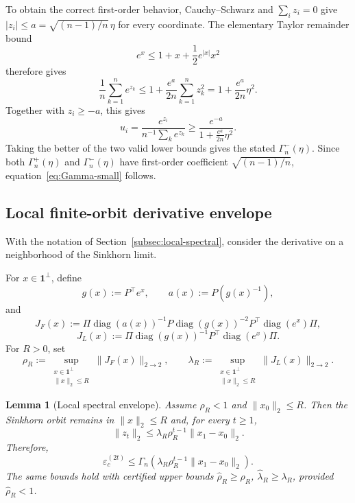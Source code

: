 \documentclass[10pt]{article}
\numberwithin{equation}{section}
\theoremstyle{plain}
\newtheorem{lemma}[theorem]{Lemma}
\theoremstyle{definition}
\theoremstyle{remark}
\newcommand{\ones}{\mathbf{1}}
\newcommand{\diag}{\operatorname{diag}}
\begin{document}
To obtain the correct first-order behavior, Cauchy--Schwarz and
\(\sum_i z_i=0\) give
\(|z_i|\le a=\sqrt{(n-1)/n}\,\eta\) for every coordinate. The elementary
Taylor remainder bound
\[
        e^x\le 1+x+\frac12 e^{|x|}x^2
\]
therefore gives
\[
        \frac1n\sum_{k=1}^n e^{z_k}
        \le
        1+\frac{e^a}{2n}\sum_{k=1}^n z_k^2
        =
        1+\frac{e^a}{2n}\eta^2.
\]
Together with \(z_i\ge-a\), this gives
\[
        u_i
        =
        \frac{e^{z_i}}{n^{-1}\sum_k e^{z_k}}
        \ge
        \frac{e^{-a}}{1+\frac{e^a}{2n}\eta^2}.
\]
Taking the better of the two valid lower bounds gives the stated
\(\Gamma_n^-(\eta)\). Since both \(\Gamma_n^+(\eta)\) and
\(\Gamma_n^-(\eta)\) have first-order coefficient
\(\sqrt{(n-1)/n}\), equation~\eqref{eq:Gamma-small} follows.

\subsection{Local finite-orbit derivative envelope}\label{app:local-envelope}

With the notation of Section~\ref{subsec:local-spectral}, consider the derivative on a neighborhood
of the Sinkhorn limit.

For \(x\in\ones^\perp\), define
\[
        g(x):=P^\top e^x,\qquad a(x):=P(g(x)^{-1}),
\]
and
\begin{equation}\label{eq:JF-JL}
        J_F(x):=
        \Pi\diag(a(x))^{-1}P\diag(g(x))^{-2}P^\top\diag(e^x)\Pi,
\end{equation}
\begin{equation}\label{eq:JL}
        J_L(x):=
        \Pi\diag(g(x))^{-1}P^\top\diag(e^x)\Pi .
\end{equation}
For \(R>0\), set
\begin{equation}\label{eq:rhoR-lambdaR}
        \rho_R:=\sup_{\substack{x\in\ones^\perp\\ \|x\|_2\le R}}\|J_F(x)\|_{2\to2},
        \qquad
        \lambda_R:=\sup_{\substack{x\in\ones^\perp\\ \|x\|_2\le R}}\|J_L(x)\|_{2\to2}.
\end{equation}

\begin{lemma}[Local spectral envelope]\label{lem:local-envelope}
Assume \(\rho_R<1\) and \(\|x_0\|_2\le R\). Then the Sinkhorn orbit remains in
\(\|x\|_2\le R\) and, for every \(t\ge1\),
\begin{equation}\label{eq:local-envelope-log}
        \|z_t\|_2\le\lambda_R\rho_R^{t-1}\|x_1-x_0\|_2 .
\end{equation}
Therefore,
\begin{equation}\label{eq:local-envelope-eps}
        \varepsilon_c^{(2t)}
        \le
        \Gamma_n\!\left(\lambda_R\rho_R^{t-1}\|x_1-x_0\|_2\right).
\end{equation}
The same bounds hold with certified upper bounds
\(\widehat\rho_R\ge\rho_R\), \(\widehat\lambda_R\ge\lambda_R\), provided
\(\widehat\rho_R<1\).
\end{lemma}
\end{document}
